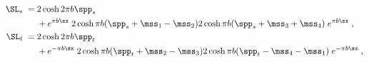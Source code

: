 \begin{equation}\begin{aligned}
\SL_s\;=\;& 2\cosh2\pi b \spp_s\\
& +e^{\pi b\sx}\;
2\cosh \pi b(\spp_s+\mss_1-\mss_2) 2\cosh \pi b(\spp_s+\mss_3+\mss_4)\;
 e^{\pi b\sx}\;, \\
\SL_t\;=\;& 2\cosh2\pi b \spp_t\\
& +e^{-\pi b\sx}\;
2\cosh \pi b(\spp_t+\mss_2-\mss_3) 2\cosh \pi b(\spp_t-\mss_4-\mss_1)\;
 e^{-\pi b\sx} \;,
\end{aligned}
\end{equation}

